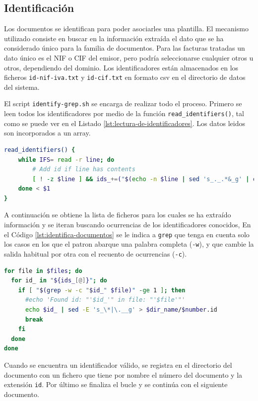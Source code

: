 \subsection{Identificación}
\label{subsec:impl-identificacion}

Los documentos se identifican para poder asociarles una plantilla. El mecanismo utilizado consiste en buscar en la información extraída el dato que se ha considerado único para la familia de documentos. Para las facturas tratadas un dato único es el NIF o CIF del emisor, pero podría seleccionarse cualquier otros u otros, dependiendo del dominio. Los identificadores están almacenados en los ficheros \verb|id-nif-iva.txt| y \verb|id-cif.txt| en formato \acrshort{csv} en el directorio de datos del sistema.

El script \verb|identify-grep.sh| se encarga de realizar todo el proceso. Primero se leen todos los identificadores por medio de la función \verb|read_identifiers()|, tal como se puede ver en el Listado \ref{lst:lectura-de-identificadores}. Los datos leidos son incorporados a un array.

\begin{lstlisting}[language=bash,caption={Lectura de identificadores.},label=lst:lectura-de-identificadores]
read_identifiers() {
    while IFS= read -r line; do
        # Add id if line has contents
        [ ! -z $line ] && ids_+=("$(echo -n $line | sed 's_._.*&_g' | cut -c 3-)")
    done < $1
}
\end{lstlisting}

A continuación se obtiene la lista de ficheros para los cuales se ha extraído información y se iteran buscando ocurrencias de los identificadores conocidos, En el Código \ref{lst:identifica-documentos} se le indica a \verb|grep| que tenga en cuenta solo los casos en los que el patron abarque una palabra completa (\verb|-w|), y que cambie la salida habitual por otra con el recuento de ocurrencias (\verb|-c|).

\begin{lstlisting}[language=bash,caption={Identificación de los documentos.},label=lst:identifica-documentos]
for file in $files; do
  for id_ in "${ids_[@]}"; do
    if [ "$(grep -w -c "$id_" $file)" -ge 1 ]; then
      #echo 'Found id: "'$id_'" in file: "'$file'"'
      echo $id_ | sed -E 's_\*|\.__g' > $dir_name/$number.id
      break
    fi
  done
done
\end{lstlisting}

Cuando se encuentra un identificador válido, se registra en el directorio del documento con un fichero que tiene por nombre el número del documento y la extensión \verb|id|. Por último se finaliza el bucle y se continúa con el siguiente documento.

